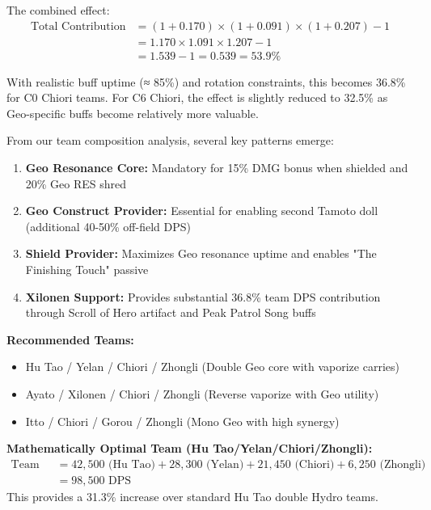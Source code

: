 \documentclass[12pt,a4paper]{article}
\begin{document}
The combined effect:
\begin{align}
\text{Total Contribution} &= (1 + 0.170) \times (1 + 0.091) \times (1 + 0.207) - 1 \\
&= 1.170 \times 1.091 \times 1.207 - 1 \\
&= 1.539 - 1 = 0.539 = 53.9\%
\end{align}

With realistic buff uptime (≈ 85\%) and rotation constraints, this becomes 36.8\% for C0 Chiori teams. For C6 Chiori, the effect is slightly reduced to 32.5\% as Geo-specific buffs become relatively more valuable.

From our team composition analysis, several key patterns emerge:

\begin{tcolorbox}[colback=c0color!5, colframe=c0color, title=C0 Sub-DPS Optimal Team Structure]
\begin{enumerate}
    \item \textbf{Geo Resonance Core:} Mandatory for 15\% DMG bonus when shielded and 20\% Geo RES shred
    \item \textbf{Geo Construct Provider:} Essential for enabling second Tamoto doll (additional 40-50\% off-field DPS)
    \item \textbf{Shield Provider:} Maximizes Geo resonance uptime and enables "The Finishing Touch" passive
    \item \textbf{Xilonen Support:} Provides substantial 36.8\% team DPS contribution through Scroll of Hero artifact and Peak Patrol Song buffs
\end{enumerate}

\textbf{Recommended Teams:}
\begin{itemize}
    \item Hu Tao / Yelan / Chiori / Zhongli (Double Geo core with vaporize carries)
    \item Ayato / Xilonen / Chiori / Zhongli (Reverse vaporize with Geo utility)
    \item Itto / Chiori / Gorou / Zhongli (Mono Geo with high synergy)
\end{itemize}

\textbf{Mathematically Optimal Team (Hu Tao/Yelan/Chiori/Zhongli):}
\begin{align}
\text{Team DPS} &= 42,500 \text{ (Hu Tao)} + 28,300 \text{ (Yelan)} + 21,450 \text{ (Chiori)} + 6,250 \text{ (Zhongli)} \\
&= 98,500 \text{ DPS}
\end{align}
This provides a 31.3\% increase over standard Hu Tao double Hydro teams.
\end{tcolorbox}
\end{document}
